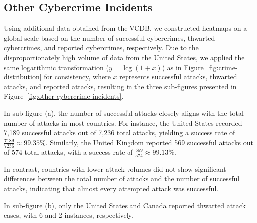 \subsection{Other Cybercrime Incidents}\label{subsec:other-cybercrime-incedents} %
	Using additional data obtained from the VCDB,
	we constructed heatmaps on a global scale based on the number of successful cybercrimes, thwarted cybercrimes, and reported cybercrimes, respectively.
	Due to the disproportionately high volume of data from the United States,
	we applied the same logarithmic transformation (\( y = \log(1 + x) \)) as in Figure~\ref{fig:crime-distribution} for consistency,
	where $x$ represents successful attacks, thwarted attacks, and reported attacks,
	resulting in the three sub-figures presented in Figure~\ref{fig:other-cybercrime-incidents}.

	In sub-figure (a), the number of successful attacks closely aligns with the total number of attacks in most countries.
	For instance, the United States recorded 7,189 successful attacks out of 7,236 total attacks,
	yielding a success rate of \( \frac{7189}{7236} \approx 99.35\% \).
	Similarly, the United Kingdom reported 569 successful attacks out of 574 total attacks,
	with a success rate of \( \frac{569}{574} \approx 99.13\% \).

	In contrast, countries with lower attack volumes did not show significant differences between the total number of attacks and the number of successful attacks,
	indicating that almost every attempted attack was successful.

	In sub-figure (b), only the United States and Canada reported thwarted attack cases, with 6 and 2 instances, respectively.

